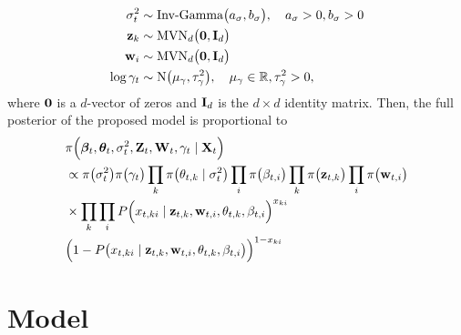 \documentclass[a4paper, 11pt]{report}
\begin{document}
\begin{itemize}
\[\begin{split}
    \sigma_t^2 &\sim \mbox{Inv-Gamma}\big(a_{\sigma}, b_{\sigma}\big), \quad a_{\sigma} > 0, b_{\sigma} > 0 \\
    {\bf z}_k &\sim \mbox{MVN}_d\big({\bf 0}, {\bf I}_d\big)\\
    {\bf w}_i &\sim \mbox{MVN}_d\big({\bf 0}, {\bf I}_d\big)\\
    \log \gamma_t &\sim \mbox{N}\big(\mu_{\gamma}, \tau_{\gamma}^2\big), \quad \mu_{\gamma} \in \mathbb{R}, \tau_{\gamma}^2 > 0,
\end{split}\]
where ${\bf 0}$ is a $d$-vector of zeros and ${\bf I}_d$ is the $d \times d$ identity matrix. Then, the full posterior of the proposed model is proportional to 
\begin{equation}
\label{lsrm.likelihood}
\begin{split}
&\pi\Big(\boldsymbol\beta_t, \boldsymbol\theta_t, \sigma_t^2, {\bf Z}_t, {\bf W}_t, \gamma_t \mid {\bf X}_t\Big)\\
&\propto \pi\big(\sigma_t^2\big) \pi\big(\gamma_t\big) \prod_{k}\pi\big(\theta_{t,k} \mid \sigma_t^2\big) \prod_{i}\pi\big(\beta_{t,i}\big) \prod_{k}\pi\big({\bf z}_{t,k}\big) \prod_{i}\pi\big({\bf w}_{t,i}\big)\\
&\times \prod_k \prod_i P\Big(x_{t,ki} \mid {\bf z}_{t,k}, {\bf w}_{t,i}, \theta_{t,k}, \beta_{t,i}\Big)^{x_{ki}}\\
&\Big(1-P\big(x_{t,ki} \mid {\bf z}_{t,k}, {\bf w}_{t,i}, \theta_{t,k}, \beta_{t,i}\big)\Big)^{1-x_{ki}}
\end{split}
\end{equation}






\chapter{Model} \label{Chapter4}

\end{itemize}
\end{document}
